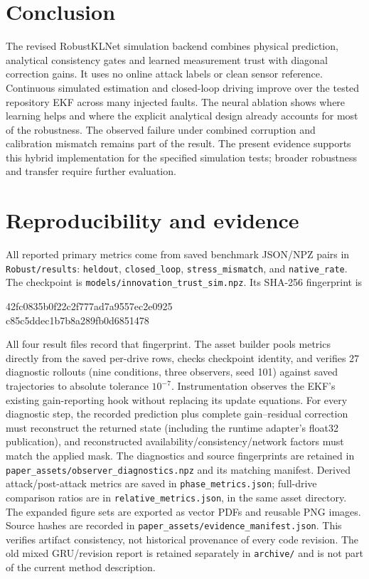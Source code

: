 ﻿\documentclass[10pt,a4paper]{article}
\begin{document}
\section{Conclusion}
The revised RobustKLNet simulation backend combines physical prediction, analytical
consistency gates and learned measurement trust with diagonal correction gains.
It uses no online attack labels or clean sensor reference.
Continuous simulated estimation and closed-loop driving improve over the tested repository
EKF across many injected faults. The neural ablation shows where learning helps and where
the explicit analytical design already accounts for most of the robustness.
The observed failure under combined corruption and calibration mismatch remains part of
the result. The present evidence supports this hybrid implementation for the specified
simulation tests; broader robustness and transfer require further evaluation.

\section*{Reproducibility and evidence}
All reported primary metrics come from saved benchmark JSON/NPZ pairs in
\texttt{Robust/results}: \texttt{heldout}, \texttt{closed\_loop},
\texttt{stress\_mismatch}, and \texttt{native\_rate}.
The checkpoint is \texttt{models/innovation\_trust\_sim.npz}.
Its SHA-256 fingerprint is
\begin{center}\small\ttfamily
42fc0835b0f22c2f777ad7a9557ec2e0925\\
c85c5ddec1b7b8a289fb0d6851478
\end{center}
All four result files record that fingerprint.
The asset builder pools metrics directly from the saved per-drive rows, checks checkpoint
identity, and verifies 27 diagnostic rollouts (nine conditions, three observers,
seed 101) against saved trajectories to absolute tolerance $10^{-7}$.
Instrumentation observes the EKF's existing gain-reporting hook without replacing its
update equations. For every diagnostic step, the recorded prediction plus complete
gain--residual correction must reconstruct the returned state (including the runtime
adapter's float32 publication), and reconstructed availability/consistency/network
factors must match the applied mask.
The diagnostics and source fingerprints are retained in
\texttt{paper\_assets/observer\_diagnostics.npz} and its matching manifest.
Derived attack/post-attack metrics are saved in \texttt{phase\_metrics.json}; full-drive
comparison ratios are in \texttt{relative\_metrics.json}, in the same asset directory.
The expanded figure sets are exported as vector PDFs and reusable PNG images.
Source hashes are recorded in \texttt{paper\_assets/evidence\_manifest.json}.
This verifies artifact consistency, not historical provenance of every code revision.
The old mixed GRU/revision report is retained separately in \texttt{archive/}
and is not part of the current method description.
\end{document}
